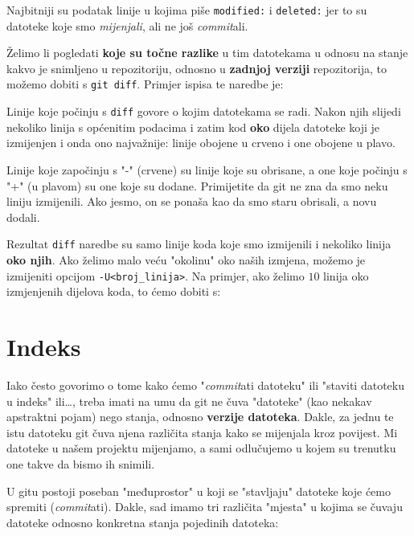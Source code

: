 

Najbitniji su podatak linije u kojima piše \verb+modified:+ i \verb+deleted:+ jer to su datoteke koje smo \emph{mijenjali}, ali ne još \emph{commit}ali.

Želimo li pogledati \textbf{koje su točne razlike} u tim datotekama u odnosu na stanje kakvo je snimljeno u repozitoriju, odnosno u \textbf{zadnjoj verziji} repozitorija, to možemo dobiti s \verb+git diff+. 
Primjer ispisa te naredbe je:



Linije koje počinju s \verb+diff+ govore o kojim datotekama se radi.
Nakon njih slijedi nekoliko linija s općenitim podacima i zatim kod \textbf{oko} dijela datoteke koji je izmijenjen i onda ono najvažnije: linije obojene u crveno i one obojene u plavo.

Linije koje započinju s "-" (crvene) su linije koje su obrisane, a one koje počinju s "+" (u plavom) su one koje su dodane. 
Primijetite da git ne zna da smo neku liniju izmijenili. 
Ako jesmo, on se ponaša kao da smo staru obrisali, a novu dodali.

Rezultat \verb+diff+ naredbe su samo linije koda koje smo izmijenili i nekoliko linija \textbf{oko njih}.
Ako želimo malo veću "okolinu" oko naših izmjena, možemo je izmijeniti opcijom \verb+-U<broj_linija>+.
Na primjer, ako želimo $10$ linija oko izmjenjenih dijelova koda, to ćemo dobiti s:


\section*{Indeks}

Iako često govorimo o tome kako ćemo "\emph{commit}ati datoteku" ili "staviti datoteku u indeks" ili\dots, treba imati na umu da git ne čuva "datoteke" (kao nekakav apstraktni pojam) nego stanja, odnosno \textbf{verzije datoteka}.
Dakle, za jednu te istu datoteku git čuva njena različita stanja kako se mijenjala kroz povijest.
Mi datoteke u našem projektu mijenjamo, a sami odlučujemo u kojem su trenutku one takve da bismo ih snimili.

U gitu postoji poseban "međuprostor" u koji se "stavljaju" datoteke koje ćemo spremiti (\emph{commit}ati).
Dakle, sad imamo tri različita "mjesta" u kojima se čuvaju datoteke odnosno konkretna stanja pojedinih datoteka:

